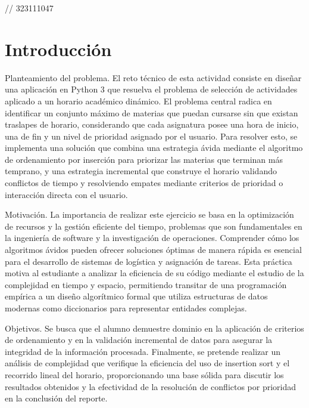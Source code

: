 // 323111047

\section{Introducción}

Planteamiento del problema. El reto técnico de esta actividad consiste en diseñar una aplicación en Python 3 que resuelva el problema de selección de actividades aplicado a un horario académico dinámico. El problema central radica en identificar un conjunto máximo de materias que puedan cursarse sin que existan traslapes de horario, considerando que cada asignatura posee una hora de inicio, una de fin y un nivel de prioridad asignado por el usuario. Para resolver esto, se implementa una solución que combina una estrategia ávida mediante el algoritmo de ordenamiento por inserción para priorizar las materias que terminan más temprano, y una estrategia incremental que construye el horario validando conflictos de tiempo y resolviendo empates mediante criterios de prioridad o interacción directa con el usuario.

\vspace{0.4cm}

Motivación. La importancia de realizar este ejercicio se basa en la optimización de recursos y la gestión eficiente del tiempo, problemas que son fundamentales en la ingeniería de software y la investigación de operaciones. Comprender cómo los algoritmos ávidos pueden ofrecer soluciones óptimas de manera rápida es esencial para el desarrollo de sistemas de logística y asignación de tareas. Esta práctica motiva al estudiante a analizar la eficiencia de su código mediante el estudio de la complejidad en tiempo y espacio, permitiendo transitar de una programación empírica a un diseño algorítmico formal que utiliza estructuras de datos modernas como diccionarios para representar entidades complejas.

\vspace{0.4cm}

Objetivos. Se busca que el alumno demuestre dominio en la aplicación de criterios de ordenamiento y en la validación incremental de datos para asegurar la integridad de la información procesada. Finalmente, se pretende realizar un análisis de complejidad que verifique la eficiencia del uso de insertion sort y el recorrido lineal del horario, proporcionando una base sólida para discutir los resultados obtenidos y la efectividad de la resolución de conflictos por prioridad en la conclusión del reporte.